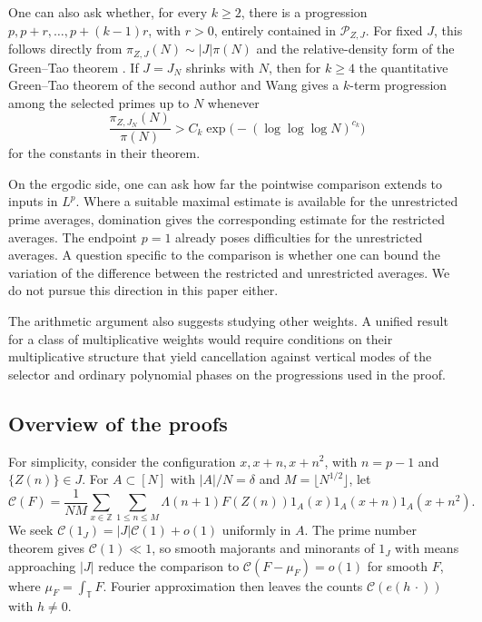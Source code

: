 \documentclass[12pt]{amsart}
\newcommand{\1}{\mathbf 1}
\theoremstyle{definition}
\begin{document}
One can also ask whether, for every $k\geq2$, there is a progression
$p,p+r,\ldots,p+(k-1)r$, with $r>0$, entirely contained in
$\mathcal P_{Z,J}$. For fixed $J$, this follows directly from
$\pi_{Z,J}(N)\sim |J|\pi(N)$ and the relative-density form of the
Green--Tao theorem \cite{GreenTao}. If $J=J_N$ shrinks with $N$, then for $k\geq4$ the quantitative
Green--Tao theorem of the second author and Wang
\cite[Theorem~1.1]{TeravainenWang} gives a $k$-term progression
among the selected primes up to $N$ whenever
\[
 \frac{\pi_{Z,J_N}(N)}{\pi(N)}
 > C_k\exp\bigl(-(\log\log\log N)^{c_k}\bigr)
\]
for the constants in their theorem.

On the ergodic side, one can ask how far the pointwise comparison
extends to inputs in $L^p$. Where a suitable maximal estimate is available for the unrestricted
prime averages, domination gives the corresponding estimate for
the restricted averages. The endpoint $p=1$ already poses
difficulties for the unrestricted averages.
A question specific to the comparison is whether one can bound the
variation of the difference between the restricted and unrestricted
averages. We do not pursue this direction in this paper either. 

The arithmetic argument also suggests studying other weights. A
unified result for a class of multiplicative weights would require
conditions on their multiplicative structure that yield cancellation
against vertical modes of the selector and ordinary polynomial
phases on the progressions used in the proof. 

\subsection{Overview of the proofs}

For simplicity, consider the configuration $x,x+n,x+n^2$, with
$n=p-1$ and $\{Z(n)\}\in J$. For $A\subset[N]$ with $|A|/N =\delta$ and
$M=\lfloor N^{1/2}\rfloor$, let
\begin{equation}\label{e:formprim}
 \mathcal C(F)=\frac1{NM}\sum_{x\in\mathbb Z}\sum_{1\leq n\leq M}
 \Lambda(n+1)F(Z(n))1_A(x)1_A(x+n)1_A(x+n^2).
\end{equation}
We seek $\mathcal C(1_J)=|J|\mathcal C(1)+o(1)$ uniformly in $A$.
The prime number theorem gives $\mathcal C(1)\ll1$, so smooth
majorants and minorants of $1_J$ with means approaching $|J|$
reduce the comparison to $\mathcal C(F-\mu_F)=o(1)$ for smooth
$F$, where $\mu_F=\int_{\mathbb T}F$. Fourier approximation then
leaves the counts $\mathcal C(e(h\,\cdot))$ with $h\ne0$.
\end{document}
